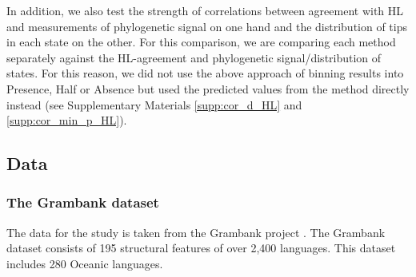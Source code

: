 \documentclass[12pt,letterpaper]{article}
\begin{document}
 
In addition, we also test the strength of correlations between agreement with HL and measurements of phylogenetic signal on one hand and the distribution of tips in each state on the other. For this comparison, we are comparing each method separately against the HL-agreement and phylogenetic signal/distribution of states. For this reason, we did not use the above approach of binning results into Presence, Half or Absence but used the predicted values from the method directly instead (see Supplementary Materials \ref{supp:cor_d_HL} and \ref{supp:cor_min_p_HL}).

\FloatBarrier
\subsection{Data}

\subsubsection{The Grambank dataset}
\label{asr:sec:GBcoverage}

The data for the study is taken from the Grambank project \citep{grambank_release}. The Grambank dataset consists of 195 structural features of over 2,400 languages. This dataset includes 280 Oceanic languages. 


 
\end{document}
